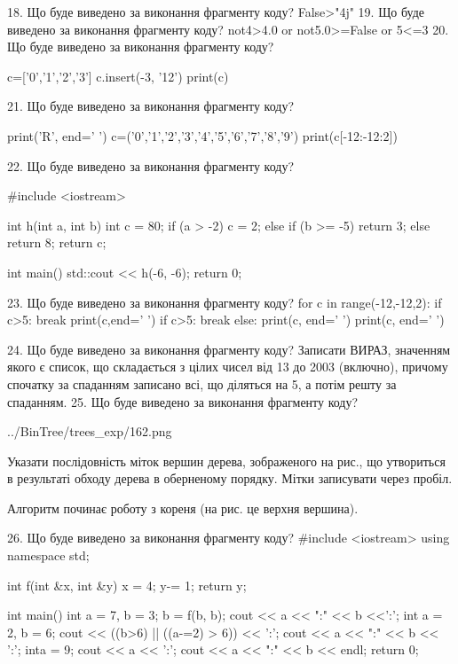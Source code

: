 \documentclass[11pt]{article}
\begin{document}
18. Що буде виведено за виконання фрагменту коду?
False>"4j"
19. Що буде виведено за виконання фрагменту коду?
not4>4.0 or not5.0>=False or 5<=3
20. Що буде виведено за виконання фрагменту коду?

c=['0','1','2','3']
c.insert(-3, '12')
print(c)


21. Що буде виведено за виконання фрагменту коду?

print('R', end=' ')
c=('0','1','2','3','4','5','6','7','8','9')
print(c[-12:-12:2])


22. Що буде виведено за виконання фрагменту коду?

#include <iostream>

int h(int a, int b){
    int c = 80;
    if (a > -2)
        c = 2;
    else if (b >= -5)
         return 3;
    else 
        return 8;
    return c;
}

int main(){
    std::cout << h(-6, -6);
    return 0;
}

23. Що буде виведено за виконання фрагменту коду?
for c in range(-12,-12,2):
    if c>5:
        break
        print(c,end=' ')
    if c>5:
        break
else:
    print(c, end=' ')
print(c, end=' ')

24. Що буде виведено за виконання фрагменту коду?
Записати ВИРАЗ, значенням якого є список, що складається з цілих чисел від 13 до 2003 (включно), причому спочатку за спаданням записано всі, що діляться на 5, а потім решту за спаданням.
25. Що буде виведено за виконання фрагменту коду?

\begin{center}
	{../BinTree/trees_exp/162.png}
\end{center}
Указати послідовність міток вершин дерева, зображеного на рис., що утвориться в результаті обходу дерева в оберненому порядку. Мітки записувати через пробіл.\par Алгоритм починає роботу з кореня (на рис. це верхня вершина).

26. Що буде виведено за виконання фрагменту коду?
#include <iostream>
using namespace std;

int f(int &x, int &y){
    x = 4;
    y-= 1;
    return y;
}

int main(){
    int a = 7, b = 3;
    b = f(b, b);
    cout << a << ":" << b <<':';
    {
        int a = 2, b = 6;
        cout << ((b>6) || ((a-=2) > 6)) << ':';
        cout << a << ":" << b << ':';
    }
    {
        inta = 9;
        cout << a << ':';
    }
    cout << a << ":" << b << endl;
    return 0;
}
\end{document}
